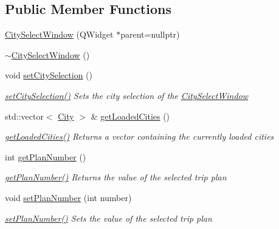 \subsection*{Public Member Functions}
\begin{DoxyCompactItemize}
\item 
\mbox{\hyperlink{class_city_select_window_a7a259de30cddf3e5dc8835546ea2de65}{City\+Select\+Window}} (Q\+Widget $\ast$parent=nullptr)
\item 
\mbox{\hyperlink{class_city_select_window_a90e12e1a1f6f246a00ddabd0c41ad589}{$\sim$\+City\+Select\+Window}} ()
\item 
void \mbox{\hyperlink{class_city_select_window_a771b0feebb7c7fdb1714917b337a37f3}{set\+City\+Selection}} ()
\begin{DoxyCompactList}\small\item\em \mbox{\hyperlink{class_city_select_window_a771b0feebb7c7fdb1714917b337a37f3}{set\+City\+Selection()}} Sets the city selection of the \mbox{\hyperlink{class_city_select_window}{City\+Select\+Window}} \end{DoxyCompactList}\item 
std\+::vector$<$ \mbox{\hyperlink{class_city}{City}} $>$ \& \mbox{\hyperlink{class_city_select_window_a7a0aacdfc7b496f7b21cba7ab6311468}{get\+Loaded\+Cities}} ()
\begin{DoxyCompactList}\small\item\em \mbox{\hyperlink{class_city_select_window_a7a0aacdfc7b496f7b21cba7ab6311468}{get\+Loaded\+Cities()}} Returns a vector containing the currently loaded cities \end{DoxyCompactList}\item 
int \mbox{\hyperlink{class_city_select_window_a63048482e621b1653250c7acbd28c3aa}{get\+Plan\+Number}} ()
\begin{DoxyCompactList}\small\item\em \mbox{\hyperlink{class_city_select_window_a63048482e621b1653250c7acbd28c3aa}{get\+Plan\+Number()}} Returns the value of the selected trip plan \end{DoxyCompactList}\item 
void \mbox{\hyperlink{class_city_select_window_a6afffce8400f9541a3c31e0e359c0d9b}{set\+Plan\+Number}} (int number)
\begin{DoxyCompactList}\small\item\em \mbox{\hyperlink{class_city_select_window_a6afffce8400f9541a3c31e0e359c0d9b}{set\+Plan\+Number()}} Sets the value of the selected trip plan \end{DoxyCompactList}\end{DoxyCompactItemize}


